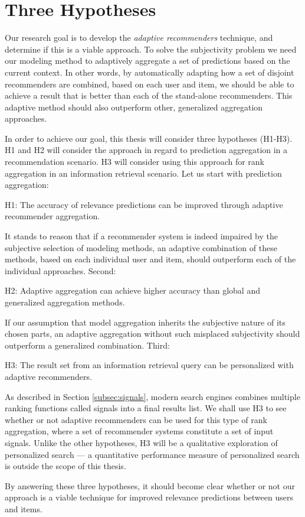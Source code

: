\section{Three Hypotheses}
\label{sec:hypotheses}

Our research goal is to develop the \emph{adaptive recommenders} technique, and determine if this is a viable approach.
To solve the subjectivity problem we need our modeling method
to adaptively aggregate a set of predictions based on the current context.
In other words, by automatically adapting how a set of disjoint recommenders
are combined, based on each user and item, we should be able to achieve a
result that is better than each of the stand-alone recommenders.
This adaptive method should also outperform other, generalized aggregation approaches.

In order to achieve our goal, this thesis will consider three hypotheses (H1-H3).
H1 and H2 will consider the approach in regard to prediction aggregation
in a recommendation scenario. H3 will consider using this approach for
rank aggregation in an information retrieval scenario.
Let us start with prediction aggregation:

\begin{blockquote}
  H1: The accuracy of relevance predictions can be improved
  through adaptive recommender aggregation.
\end{blockquote}
%
It stands to reason that if a recommender system is indeed impaired
by the subjective selection of modeling methods,
an adaptive combination of these methods, based on each individual user and item, 
should outperform each of the individual approaches.
Second:

\begin{blockquote}
  H2: Adaptive aggregation can achieve higher accuracy than global and generalized aggregation methods.
\end{blockquote}
%
If our assumption that model aggregation inherits the subjective nature of its chosen parts,
an adaptive aggregation without such misplaced subjectivity should outperform a
generalized combination.
Third:

\begin{blockquote}
  H3: The result set from an information retrieval query
  can be personalized with adaptive recommenders.
\end{blockquote}
%
As described in Section \ref{subsec:signals},
modern search engines combines multiple ranking functions called signals into a final results list.
We shall use H3 to see whether or not adaptive recommenders can be used for this type of rank aggregation,
where a set of recommender systems constitute a set of input signals.
Unlike the other hypotheses, H3 will be a qualitative exploration of personalized search ---
a quantitative performance measure of personalized search is outside the scope of this thesis.

By answering these three hypotheses, it should become clear whether or not
our approach is a viable technique for improved relevance predictions
between users and items.

